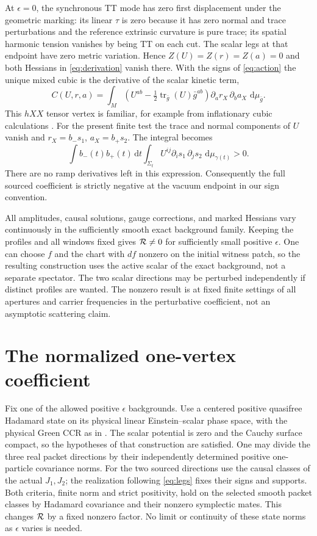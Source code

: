 \documentclass[11pt]{article}
\newcommand{\dd}{\,\mathrm d}
\newcommand{\tr}{\operatorname{tr}}
\numberwithin{equation}{section}
\begin{document}
At \(\epsilon=0\), the synchronous TT mode has zero
first displacement under the geometric marking:
its linear \(\tau\) is zero because it has zero
normal and trace perturbations and the reference
extrinsic curvature is pure trace; its spatial
harmonic tension vanishes by being TT on each cut.
The scalar legs at that endpoint have zero metric
variation. Hence \(Z(U)=Z(r)=Z(a)=0\) and both
Hessians in \eqref{eq:derivation} vanish there.
With the signs of \eqref{eq:action} the unique mixed
cubic is the derivative of the scalar kinetic term,
\[
 C(U,r,a)=\int_M
 \left(U^{ab}-\tfrac12\tr_{\bar g}(U)\bar g^{ab}\right)
             \partial_a r_X\,\partial_b a_X\,\dd\mu_{\bar g}.
\]
This \(hXX\) tensor vertex is familiar, for example
from inflationary cubic calculations \cite{maldacena}.
For the present finite test the trace and normal
components of \(U\) vanish and \(r_X=b_-s_1\),
\(a_X=b_+s_2\). The integral becomes
\[
 \int\! b_-(t)b_+(t)\dd t\int_{\Sigma_t}
 U^{ij}\partial_i s_1\,\partial_j s_2\,
                                   \dd\mu_{\gamma(t)}>0.
\]
There are no ramp derivatives left in this expression.
Consequently the full sourced coefficient is strictly
negative at the vacuum endpoint in our sign convention.

All amplitudes, causal solutions, gauge corrections,
and marked Hessians vary continuously in the sufficiently
smooth exact background family. Keeping the profiles and
all windows fixed gives \({\cal R}\ne0\) for
sufficiently small positive \(\epsilon\). One can choose
\(f\) and the chart with \(df\) nonzero on the initial
witness patch, so the resulting construction uses the
active scalar of the exact background, not a separate
spectator. The two scalar directions may be perturbed
independently if distinct profiles are wanted. The
nonzero result is at fixed finite settings of all
apertures and carrier frequencies in the perturbative
coefficient, not an asymptotic scattering claim.

\section{The normalized one-vertex coefficient}

Fix one of the allowed positive \(\epsilon\) backgrounds.
Use a centered positive quasifree Hadamard state on its
physical linear Einstein--scalar phase space, with
the physical Green CCR as in \cite{hadamard,modular}.
The scalar potential is zero and the Cauchy surface
compact, so the hypotheses of that construction are
satisfied. One may divide the three real packet
directions by their independently determined positive
one-particle covariance norms. For the two sourced
directions use the causal classes of the actual
\(J_1,J_2\); the realization following
\eqref{eq:legs} fixes their signs and supports.
Both criteria, finite norm and strict positivity,
hold on the selected smooth packet classes by
Hadamard covariance and their nonzero symplectic
mates. This changes \({\cal R}\) by a fixed nonzero
factor. No limit or continuity of these state norms
as \(\epsilon\) varies is needed.
\end{document}
